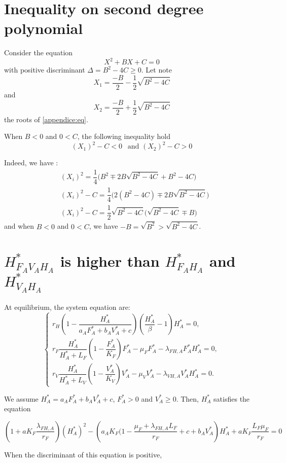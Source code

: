 \documentclass{article}
\newcommand{\lfa}{\lambda_{FH, A}}
\begin{document}
\begin{appendices}
\section{Inequality on second degree polynomial \label{appendice:ineq2nd}}

Consider the equation
\begin{equation}
X^2 + B X + C = 0
\label{appendice:eq}
\end{equation}
with positive discriminant $\Delta = B^2 - 4C \geq 0$. Let note $$X_{1} = \dfrac{-B}{2} - \dfrac{1}{2} \sqrt{B^2 - 4 C}$$ and $$X_2 = \dfrac{-B}{2} + \dfrac{1}{2} \sqrt{B^2 - 4 C}$$  the roots of \eqref{appendice:eq}.

When $B < 0$ and $0 < C$, the following inequality hold
\begin{equation}
(X_1) ^ 2 - C < 0 \:\:\text{ and } (X_2)^2 - C > 0
\end{equation}

Indeed, we have :
\begin{subequations}
\begin{align}
&(X_i) ^2 = \dfrac{1}{4} \Big(B^2 \mp 2 B\sqrt{B^2 - 4C} + B^2 - 4C \Big) \\
&(X_i)^2 - C = \dfrac{1}{4} \Big(2(B^2 - 4C) \mp 2B \sqrt{B^2 - 4C} \Big) \\
&(X_i)^2 - C = \dfrac{1}{2} \sqrt{B^2 - 4C} \Big( \sqrt{B^2 - 4C} \mp B \Big)
\end{align}
\end{subequations}
and when $B < 0$ and $0 < C$, we have $ -B = \sqrt{B^2} > \sqrt{B^2 - 4C}$.

\section{$H_{F_AV_AH_A}^*$ is higher than $H_{F_AH_A}^*$ and $H_{V_AH_A}^*$}
At equilibrium, the system equation are:
\begin{equation}
\left\lbrace \begin{array}{l}
r_{H}\left(1-\dfrac{H_A^*}{a_{A}F^*_{A}+b_{A}V^*_{A}+c}\right)\left(\dfrac{H^*_A}{\beta}-1\right)H^*_A = 0, \\
r_F\dfrac{H^*_A}{H_A^* + L_F} \left(1-\dfrac{F_A^*}{K_{F}}\right)F_A^*-\mu_{F}F_A^*-\lambda_{FH,A}F_A^*H_A^* = 0, \\
r_{V}\dfrac{H_A^*}{H_A^*+L_{V}}\left(1-\dfrac{V_A^*}{K_{V}}\right)V_A^*-\mu_{V}V_A^*-\lambda_{VH,A}V_A^*H_A^* = 0.
\end{array} \right.
\label{modelAnthropo:eq}
\end{equation}

We assume $H_A^* = a_AF_A^* + b_AV_A^* + c$, $F^*_A > 0$ and $V_A^* \geq 0$. Then, $H_A^*$ satisfies the equation

\begin{equation}
 \left(1 + a K_F \dfrac{\lfa}{r_F} \right)\left(H^*_A\right)^2 - \left(a_A K_F \Big(1 - \dfrac{\mu_F + \lfa L_F}{r_F} + c + b_A V^*_A \right) H^*_A + aK_F \dfrac{L_F\mu_F}{r_F} = 0
\end{equation}

When the discriminant of this equation is positive,


\end{appendices}



\end{document}

